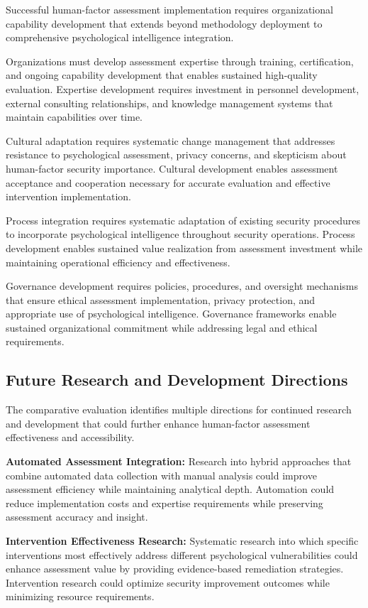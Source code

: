 \documentclass[10pt, twocolumn]{article}
\begin{document}
Successful human-factor assessment implementation requires organizational capability development that extends beyond methodology deployment to comprehensive psychological intelligence integration.

Organizations must develop assessment expertise through training, certification, and ongoing capability development that enables sustained high-quality evaluation. Expertise development requires investment in personnel development, external consulting relationships, and knowledge management systems that maintain capabilities over time.

Cultural adaptation requires systematic change management that addresses resistance to psychological assessment, privacy concerns, and skepticism about human-factor security importance. Cultural development enables assessment acceptance and cooperation necessary for accurate evaluation and effective intervention implementation.

Process integration requires systematic adaptation of existing security procedures to incorporate psychological intelligence throughout security operations. Process development enables sustained value realization from assessment investment while maintaining operational efficiency and effectiveness.

Governance development requires policies, procedures, and oversight mechanisms that ensure ethical assessment implementation, privacy protection, and appropriate use of psychological intelligence. Governance frameworks enable sustained organizational commitment while addressing legal and ethical requirements.

\subsection{Future Research and Development Directions}

The comparative evaluation identifies multiple directions for continued research and development that could further enhance human-factor assessment effectiveness and accessibility.

\textbf{Automated Assessment Integration:} Research into hybrid approaches that combine automated data collection with manual analysis could improve assessment efficiency while maintaining analytical depth. Automation could reduce implementation costs and expertise requirements while preserving assessment accuracy and insight.

\textbf{Intervention Effectiveness Research:} Systematic research into which specific interventions most effectively address different psychological vulnerabilities could enhance assessment value by providing evidence-based remediation strategies. Intervention research could optimize security improvement outcomes while minimizing resource requirements.
\end{document}
